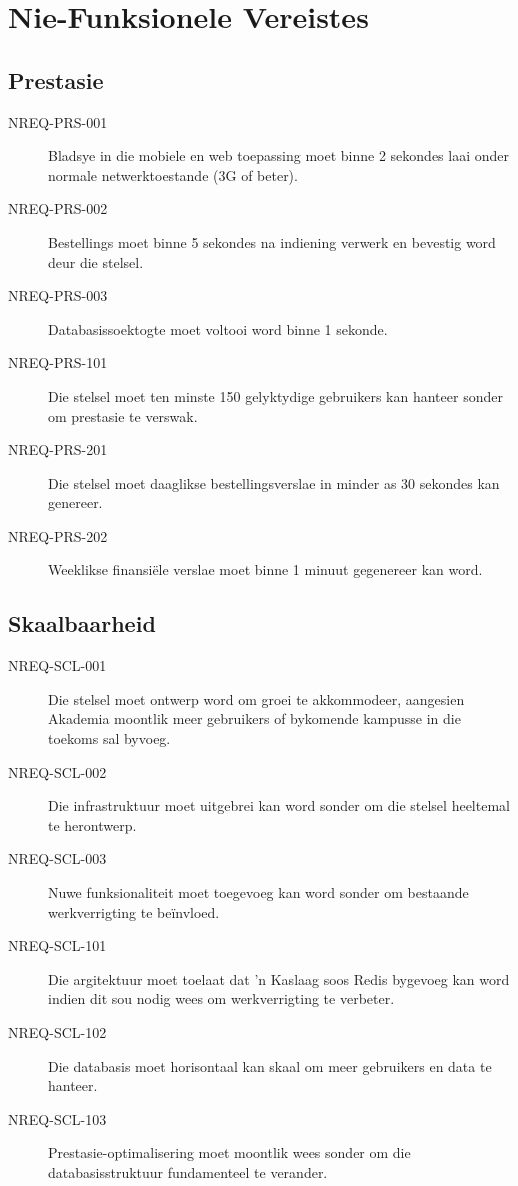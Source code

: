 \section{Nie-Funksionele Vereistes}

\subsection{Prestasie}
\begin{description}
  \item[NREQ-PRS-001] Bladsye in die mobiele en web toepassing moet binne 2 sekondes laai onder normale netwerktoestande (3G of beter).
  \item[NREQ-PRS-002] Bestellings moet binne 5 sekondes na indiening verwerk en bevestig word deur die stelsel.
  \item[NREQ-PRS-003] Databasissoektogte moet voltooi word binne 1 sekonde.
  \item[NREQ-PRS-101] Die stelsel moet ten minste 150 gelyktydige gebruikers kan hanteer sonder om prestasie te verswak.
  \item[NREQ-PRS-201] Die stelsel moet daaglikse bestellingsverslae in minder as 30 sekondes kan genereer.
  \item[NREQ-PRS-202] Weeklikse finansiële verslae moet binne 1 minuut gegenereer kan word.
\end{description}

\subsection{Skaalbaarheid}
\begin{description}
  \item[NREQ-SCL-001] Die stelsel moet ontwerp word om groei te akkommodeer, aangesien Akademia moontlik meer gebruikers of bykomende kampusse in die toekoms sal byvoeg.
  \item[NREQ-SCL-002] Die infrastruktuur moet uitgebrei kan word sonder om die stelsel heeltemal te herontwerp.
  \item[NREQ-SCL-003] Nuwe funksionaliteit moet toegevoeg kan word sonder om bestaande werkverrigting te beïnvloed.
  \item[NREQ-SCL-101] Die argitektuur moet toelaat dat 'n Kaslaag soos Redis
  bygevoeg kan word indien dit sou nodig wees om werkverrigting te verbeter.
  \item[NREQ-SCL-102] Die databasis moet horisontaal kan skaal om meer gebruikers en data te hanteer.
  \item[NREQ-SCL-103] Prestasie-optimalisering moet moontlik wees sonder om die databasisstruktuur fundamenteel te verander.
\end{description}


